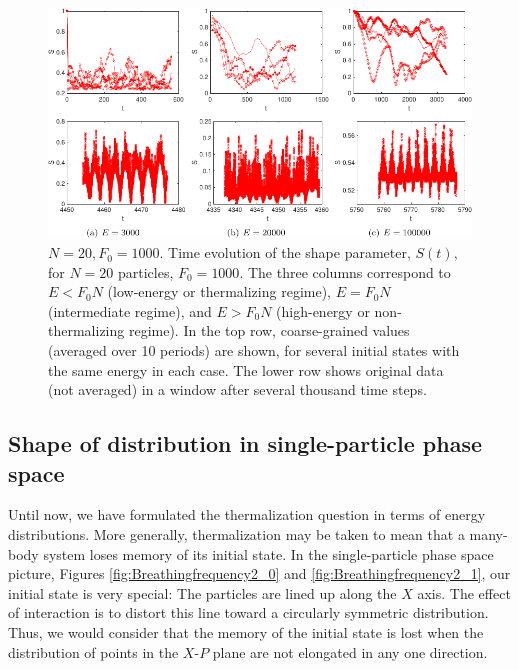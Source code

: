 \documentclass[a4paper, onecolumn]{revtex4-1}
\begin{document}
\begin{figure}[tb]
\includegraphics[width=\textwidth]{ZhiyuPictures/combine_shapedynamics_a_01-crop.pdf}
\caption{$N=20, F_0=1000$. Time evolution of the shape parameter, $S(t)$, for $N=20$ particles,
  $F_0=1000$.  The three columns correspond to $E<F_0N$ (low-energy or thermalizing regime),
  $E=F_0N$ (intermediate regime), and $E>F_0N$ (high-energy or non-thermalizing regime).  In the top
  row, coarse-grained values (averaged over 10 periods) are shown, for several initial states with
  the same energy in each case.  The lower row shows original data (not averaged) in a window after
  several thousand time steps.  }
\label{fig:time_evolution_of_S}
\end{figure}




\subsection{Shape of distribution in single-particle phase space}\label{section:Shape}

Until now, we have formulated the thermalization question in terms of energy distributions.  More
generally, thermalization may be taken to mean that a many-body system loses memory of its initial
state.  In the single-particle phase space picture, Figures \ref{fig:Breathingfrequency2_0} and
\ref{fig:Breathingfrequency2_1}, our initial state is very special: The particles are lined up along
the $X$ axis.  The effect of interaction is to distort this line toward a circularly symmetric
distribution.  Thus, we would consider that the memory of the initial state is lost when the
distribution of points in the $X$-$P$ plane are not elongated in any one direction.
\end{document}

